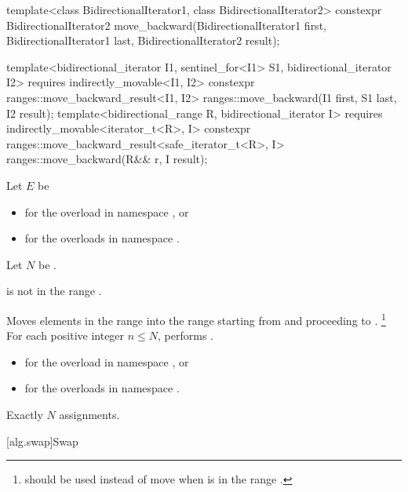 %
\begin{itemdecl}
template<class BidirectionalIterator1, class BidirectionalIterator2>
  constexpr BidirectionalIterator2
    move_backward(BidirectionalIterator1 first, BidirectionalIterator1 last,
                  BidirectionalIterator2 result);

template<bidirectional_iterator I1, sentinel_for<I1> S1, bidirectional_iterator I2>
  requires indirectly_movable<I1, I2>
  constexpr ranges::move_backward_result<I1, I2>
    ranges::move_backward(I1 first, S1 last, I2 result);
template<bidirectional_range R, bidirectional_iterator I>
  requires indirectly_movable<iterator_t<R>, I>
  constexpr ranges::move_backward_result<safe_iterator_t<R>, I>
    ranges::move_backward(R&& r, I result);
\end{itemdecl}

\begin{itemdescr}
\pnum
Let $E$ be
\begin{itemize}
\item
  for the overload in namespace , or
\item
  for the overloads in namespace .
\end{itemize}
Let $N$ be .

\pnum
\expects
{} is not in the range .

\pnum
\effects
Moves elements in the range 
into the range 
starting from  and proceeding to .%
\footnote{ should be used instead of move
when  is in the range .}
For each positive integer $n \le N$,
performs .

\pnum
\returns
\begin{itemize}
\item
  for the overload in namespace , or
\item
  for the overloads in namespace .
\end{itemize}

\pnum
\complexity
Exactly $N$ assignments.
\end{itemdescr}

[alg.swap]{Swap}

